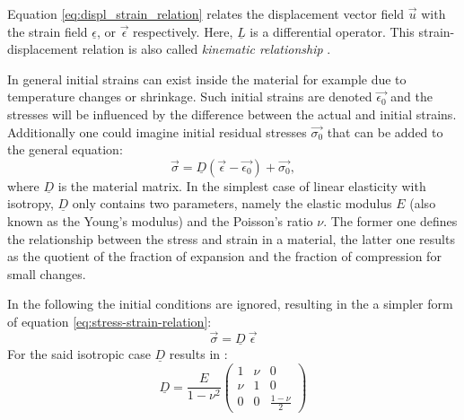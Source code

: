  Equation \ref{eq:displ_strain_relation} relates the displacement vector field $\vec{u}$ with the strain field $\underline{\epsilon}$, or $\vec{\epsilon}$ respectively. Here, $\underline{L}$ is a differential operator. This strain-displacement relation is also called \textit{kinematic relationship} \cite{steinke2005finite}.
 
 In general initial strains can exist inside the material for example due to temperature changes or shrinkage. Such initial strains are denoted $\vec{\epsilon_0}$ and the stresses will be influenced by the difference between the actual and initial strains. Additionally one could imagine initial residual stresses $\vec{\sigma_0}$ that can be added to the general equation:
 \begin{equation}\label{eq:stress-strain-relation}
 \vec{\sigma} = \underline{D}\left(\vec{\epsilon}-\vec{\epsilon_0}\right)+\vec{\sigma_0},
 \end{equation}
 where $\underline{D}$ is the material matrix. In the simplest case of linear elasticity with isotropy, $\underline{D}$ only contains two parameters, namely the elastic modulus $E$ (also known as the Young's modulus) and the Poisson's ratio $\nu$. The former one defines the relationship between the stress and strain in a material, the latter one results as the quotient of the fraction of expansion and the fraction of compression for small changes.
 
 In the following the initial conditions are ignored, resulting in the a simpler form of equation \ref{eq:stress-strain-relation}:
 \begin{equation}
 \vec{\sigma} = \underline{D}\ \vec{\epsilon}
 \end{equation}
 For the said isotropic case $\underline{D}$ results in \cite{zienkiewicz2000finite}:
 \begin{equation}
 \underline{D} = \frac{E}{1-\nu^2}\begin{pmatrix}
 1 & \nu & 0 \\
 \nu & 1 & 0 \\
 0 & 0 & \frac{1-\nu}{2}
 \end{pmatrix}
 \end{equation}
 
